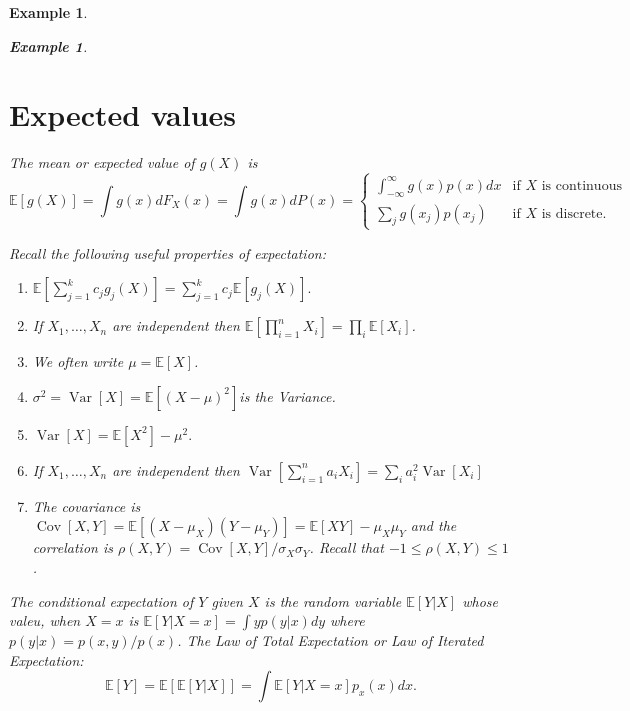 \documentclass[10pt]{article}
\newtheorem{example}[ex]{Example}
\newcommand{\Expect}[1]{\mathbb{E}\!\left[#1\right]}
\DeclareMathOperator*{\Variance}{Var}
\newcommand{\Var}[1]{\Variance\!\left[#1\right]}
\DeclareMathOperator*{\Covariance}{Cov}
\newcommand{\Cov}[1]{\Covariance\!\left[#1\right]}
\begin{document}
\begin{example}
\begin{example}
\section{Expected values}
\label{sec:expected-values}

The {\em mean} or expected value of $g(X)$ is
\begin{equation}
  \label{eq:6}
  \Expect{g(X)} = \int g(x)dF_X(x) = \int g(x) dP(x) = \begin{cases}
    \int_{-\infty}^{\infty} g(x)p(x)dx & \mbox{if $X$ is continuous}\\
    \sum_j g(x_j)p(x_j) & \mbox{if $X$ is discrete.}
  \end{cases}
\end{equation}

Recall the following useful properties of expectation:

\begin{enumerate}
\item $\Expect{\sum^k_{j=1} c_jg_j(X)} = \sum^k_{j=1} c_j\Expect{g_j(X)}.$
\item If $X_1, \ldots , X_n$ are independent then
    $\Expect{ \prod_{i=1}^n X_i } = \prod_i \Expect{X_i}$.
\item We often write $\mu = \Expect{X}$.
\item $\sigma^2 =\Var{X}=\Expect{(X-\mu)^2}$is the Variance.
\item $\Var{X}=\Expect{X^2}-\mu^2.$
\item If $X_1, \ldots , X_n$ are independent then
  $\Var{\sum_{i=1}^n a_i X_i} = \sum_i a_i^2\Var{X_i}$
\item The covariance is $\Cov{X,Y}=\Expect{(X-\mu_X)(Y -\mu_Y)}=\Expect{XY}-\mu_X\mu_Y$
and the correlation is $\rho(X,Y)=\Cov{X,Y}/\sigma_X\sigma_Y$. Recall
that $−1\leq \rho (X,Y)\leq1$.
\end{enumerate}

The conditional expectation of $Y$ given $X$ is the random variable
$\Expect{Y|X}$ whose valeu, when $X=x$ is $\Expect{Y|X=x} = \int y p(y|x) dy$
where $p(y|x) = p(x,y)/p(x)$. The {\em Law of Total Expectation} or
{\em Law of Iterated Expectation:}
\begin{equation}
  \label{eq:8}
  \Expect{Y} = \Expect{\Expect{Y|X}} = \int \Expect{Y|X=x}p_x(x)dx.
\end{equation}



\end{example}
\end{example}
\end{document}
